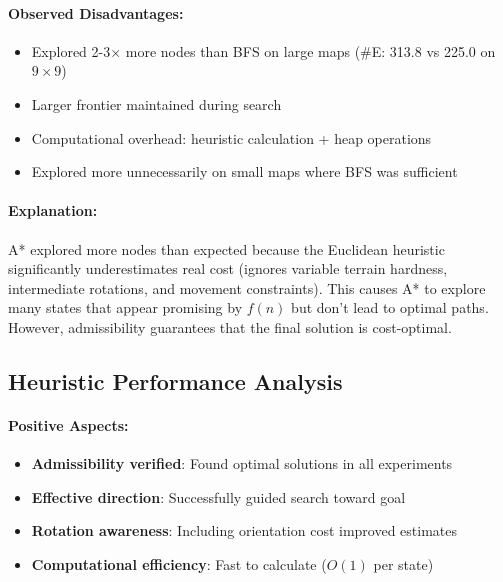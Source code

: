 \documentclass[11pt,a4paper]{article}
\begin{document}
\paragraph{Observed Disadvantages:}
\begin{itemize}[leftmargin=1.5cm,itemsep=0.1em]
    \item Explored 2-3× more nodes than BFS on large maps (\#E: 313.8 vs 225.0 on $9\times9$)
    \item Larger frontier maintained during search
    \item Computational overhead: heuristic calculation + heap operations
    \item Explored more unnecessarily on small maps where BFS was sufficient
\end{itemize}

\paragraph{Explanation:}
A* explored more nodes than expected because the Euclidean heuristic significantly underestimates real cost (ignores variable terrain hardness, intermediate rotations, and movement constraints). This causes A* to explore many states that appear promising by $f(n)$ but don't lead to optimal paths. However, admissibility guarantees that the final solution is cost-optimal.

\subsection{Heuristic Performance Analysis}

\paragraph{Positive Aspects:}
\begin{itemize}[leftmargin=1.5cm,itemsep=0.1em]
    \item \textbf{Admissibility verified}: Found optimal solutions in all experiments
    \item \textbf{Effective direction}: Successfully guided search toward goal
    \item \textbf{Rotation awareness}: Including orientation cost improved estimates
    \item \textbf{Computational efficiency}: Fast to calculate ($O(1)$ per state)
\end{itemize}
\end{document}

